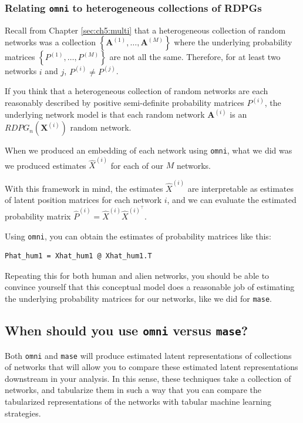 \subsubsection{Relating \texttt{omni} to heterogeneous collections of RDPGs}

Recall from Chapter \ref{sec:ch5:multi} that a heterogeneous collection of random networks was a collection $\left\{\mathbf A^{(1)}, \hdots, \mathbf A^{(M)}\right\}$ where the underlying probability matrices $\left\{P^{(1)}, \hdots, P^{(M)}\right\}$ are not all the same. Therefore, for at least two networks $i$ and $j$, $P^{(i)} \neq P^{(j)}$.

If you think that a heterogeneous collection of random networks are each reasonably described by positive semi-definite probability matrices $P^{(i)}$, the underlying network model is that each random network $\mathbf A^{(i)}$ is an $RDPG_n\left(\mathbf X^{(i)}\right)$ random network. 

When we produced an embedding of each network using \texttt{omni}, what we did was we produced estimates $\hat X^{(i)}$ for each of our $M$ networks. 

With this framework in mind, the estimates $\hat X^{(i)}$ are interpretable as estimates of latent position matrices for each network $i$, and we can evaluate the estimated probability matrix $\hat P^{(i)} = \hat X^{(i)} \hat X^{(i)}^\top$. 

Using \texttt{omni}, you can obtain the estimates of probability matrices like this:

\begin{lstlisting}[style=python]
Phat_hum1 = Xhat_hum1 @ Xhat_hum1.T
\end{lstlisting}

Repeating this for both human and alien networks, you should be able to convince yourself that this conceptual model does a reasonable job of estimating the underlying probability matrices for our networks, like we did for \texttt{mase}.

\subsection{When should you use \texttt{omni} versus \texttt{mase}?}

Both \texttt{omni} and \texttt{mase} will produce estimated latent representations of collections of networks that will allow you to compare these estimated latent representations downstream in your analysis. In this sense, these techniques take a collection of networks, and tabularize them in such a way that you can compare the tabularized representations of the networks with tabular machine learning strategies. 

